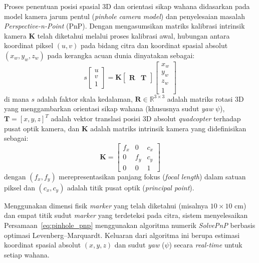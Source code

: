 \documentclass[12pt,a4paper]{report}
\numberwithin{equation}{chapter}
\begin{document}
Proses penentuan posisi spasial 3D dan orientasi sikap wahana didasarkan pada model kamera jarum pentul (\textit{pinhole camera model}) dan penyelesaian masalah \textit{Perspective-n-Point} (PnP).
Dengan mengasumsikan matriks kalibrasi intrinsik kamera $\mathbf{K}$ telah diketahui melalui proses kalibrasi awal, hubungan antara koordinat piksel $(u, v)$ pada bidang citra dan koordinat spasial absolut $(x_w, y_w, z_w)$ pada kerangka acuan dunia dinyatakan sebagai:
\begin{equation}
    s 
    \begin{bmatrix}
        u \\ v \\ 1
    \end{bmatrix}
    = \mathbf{K} 
    \begin{bmatrix}
        \mathbf{R} & \mathbf{T}
    \end{bmatrix}
    \begin{bmatrix}
        x_w \\ y_w \\ z_w \\ 1
    \end{bmatrix}
    \label{eq:pinhole_pnp}
\end{equation}
di mana $s$ adalah faktor skala kedalaman, $\mathbf{R} \in \mathbb{R}^{3 \times 3}$ adalah matriks rotasi 3D yang menggambarkan orientasi sikap wahana (khususnya sudut \textit{yaw} $\psi$), $\mathbf{T} = [x, y, z]^T$ adalah vektor translasi posisi 3D absolut \textit{quadcopter} terhadap pusat optik kamera, dan $\mathbf{K}$ adalah matriks intrinsik kamera yang didefinisikan sebagai:
\begin{equation}
    \mathbf{K} = 
    \begin{bmatrix}
        f_x & 0 & c_x \\
        0 & f_y & c_y \\
        0 & 0 & 1
    \end{bmatrix}
\end{equation}
dengan $(f_x, f_y)$ merepresentasikan panjang fokus (\textit{focal length}) dalam satuan piksel dan $(c_x, c_y)$ adalah titik pusat optik (\textit{principal point}).

Menggunakan dimensi fisik \textit{marker} yang telah diketahui (misalnya $10 \times 10\text{ cm}$) dan empat titik sudut \textit{marker} yang terdeteksi pada citra, sistem menyelesaikan Persamaan~\ref{eq:pinhole_pnp} menggunakan algoritma numerik \textit{SolvePnP} berbasis optimasi Levenberg--Marquardt.
Keluaran dari algoritma ini berupa estimasi koordinat spasial absolut $(x, y, z)$ dan sudut \textit{yaw} ($\psi$) secara \textit{real-time} untuk setiap wahana.
\end{document}

